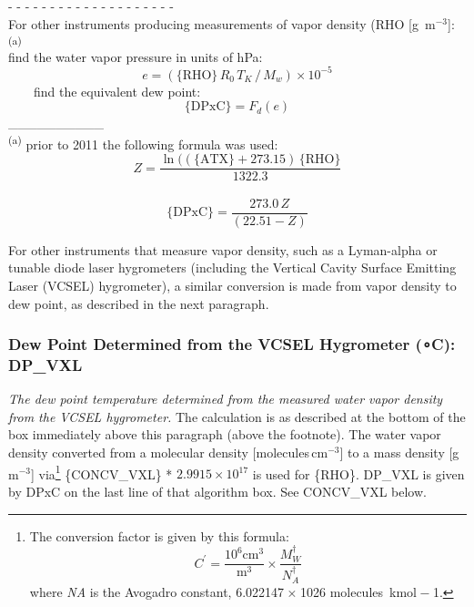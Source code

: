 \documentclass[
]{book}
\begin{document}
- - - - - - - - - - - - - - - - - - - -\\
For other instruments producing measurements of vapor density (RHO
{[}g~m\(^{-3}\){]}:\textsuperscript{(a)}\\
\hspace*{0.333em}\hspace*{0.333em}\hspace*{0.333em}\hspace*{0.333em}find the water vapor pressure in units of hPa:
\begin{equation}
e = (\mathrm{\{RHO\}}\,R_{0}\,T_{K}\,/\,M_{w})\times 10^{-5}
\label{eq:RHObox}
\end{equation}
~~~~find the equivalent dew point:\\
\begin{equation}
\mathrm{\{DPxC\}} = F_{d}(e)
\label{eq:DPxC2}
\end{equation}
\_\_\_\_\_\_\_\_\_\_\\
\textsuperscript{(a)} prior to 2011 the following formula was used:
\[Z=\frac{\ln((\mathrm{\{ATX\}}+273.15)\,\mathrm{\{RHO\}}}{1322.3}\]\\
\[\mathrm{\{DPxC\}}=\frac{273.0\,Z}{(22.51-Z)}\]

For other instruments that measure vapor density, such as a Lyman-alpha or tunable diode laser hygrometers (including the Vertical Cavity Surface Emitting Laser (VCSEL) hygrometer), a similar conversion is made from vapor density to dew point, as described in the next paragraph.

\hypertarget{vcsel-dp}{%
\subsubsection*{\texorpdfstring{Dew Point Determined from the VCSEL Hygrometer ({∘}C): DP\_VXL}{Dew Point Determined from the VCSEL Hygrometer (∘C): DP\_VXL}}\label{vcsel-dp}}

\emph{The dew point temperature determined from the measured water vapor density from the VCSEL hygrometer.} The calculation is as described at the bottom of the box immediately above this paragraph (above the footnote). The water vapor density converted from a molecular density {[}molecules\(\,\)cm\(^{-3}\){]} to a mass density {[}g\(\,\)m\(^{-3}\){]} via\footnote{The conversion factor is given by this formula:
  {\[C^{\prime}=\frac{10^{6}\mathrm{cm}^{3}}{\mathrm{m}^{3}}\times\frac{M_{W}^{\dagger}}{N_{A}^{\dagger}}\]} where {\emph{N}\emph{A}} is the Avogadro constant, 6.022147{ × 1026} molecules~kmol{ − 1}.}
\{CONCV\_VXL\} * \(2.9915\times 10^{17}\)
is used for \{RHO\}. DP\_VXL is given by DPxC on the last line of that algorithm box. See CONCV\_VXL below.
\end{document}
